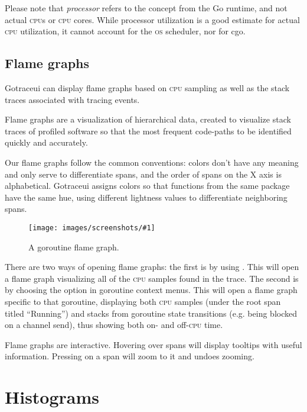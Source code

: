 \documentclass[10pt,letterpaper,oneside,openany,english]{memoir}
\newcommand{\shortcut}{\ctrl{} or \cmdmac}
\newcommand{\screenshot}[2]{%
\begin{figure}[!ht]
  \centering
  \texttt{[image: images/screenshots/\#1]}
  \caption{#2}
\end{figure}}
\begin{document}
Please note that \emph{processor} refers to the concept from the Go runtime, and not actual \textsc{cpu}s or \textsc{cpu} cores.
While processor utilization is a good estimate for actual \textsc{cpu} utilization, it cannot account for the \textsc{os} scheduler, nor for cgo.

\subsection{Flame graphs}\label{flamegraphs}

Gotraceui can display flame graphs based on \textsc{cpu} sampling as well as the stack traces associated with tracing
events.

\begin{displayquote}
  Flame graphs are a visualization of hierarchical data, created to visualize stack traces of profiled
  software so that the most frequent code-paths to be identified quickly and accurately.
\end{displayquote}

Our flame graphs follow the common conventions:
colors don't have any meaning and only serve to differentiate spans,
and the order of spans on the X axis is alphabetical.
Gotraceui assigns colors so that functions from the same package have the same hue,
using different lightness values to differentiate neighboring spans.

\screenshot{flame-graph.png}{A goroutine flame graph.}

There are two ways of opening flame graphs:
the first is by using .
This will open a flame graph visualizing all of the \textsc{cpu} samples found in the trace.
The second is by choosing the  option in goroutine context menus.
This will open a flame graph specific to that goroutine,
displaying both \textsc{cpu} samples (under the root span titled \enquote{Running})
and stacks from goroutine state transitions (e.g. being blocked on a channel send),
thus showing both on- and off-\textsc{cpu} time.

Flame graphs are interactive.
Hovering over spans will display tooltips with useful information.
Pressing \keys{\shortcut + LMB} on a span will zoom to it and \keys{\shortcut + Z} undoes zooming.

\section{Histograms}\label{histograms}
\end{document}

